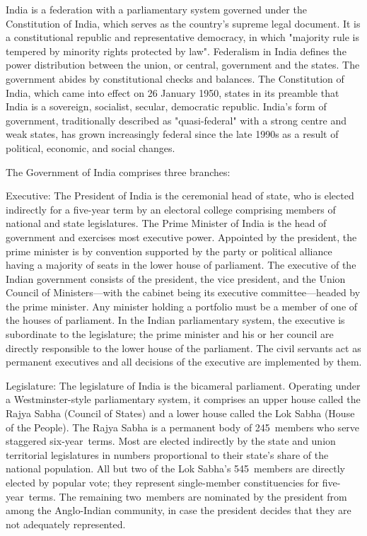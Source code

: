 India is a federation with a parliamentary system governed under the
Constitution of India, which serves as the country's supreme legal
document. It is a constitutional republic and representative democracy,
in which "majority rule is tempered by minority rights protected by
law". Federalism in India defines the power distribution between the
union, or central, government and the states. The government abides by
constitutional checks and balances. The Constitution of India, which
came into effect on 26 January 1950, states in its preamble that India
is a sovereign, socialist, secular, democratic republic. India's form of
government, traditionally described as "quasi-federal" with a strong
centre and weak states, has grown increasingly federal since the late
1990s as a result of political, economic, and social changes.

The Government of India comprises three branches:

Executive: The President of India is the ceremonial head of state, who
is elected indirectly for a five-year term by an electoral college
comprising members of national and state legislatures. The Prime
Minister of India is the head of government and exercises most executive
power. Appointed by the president, the prime minister is by convention
supported by the party or political alliance having a majority of seats
in the lower house of parliament. The executive of the Indian government
consists of the president, the vice president, and the Union Council of
Ministers---with the cabinet being its executive committee---headed by
the prime minister. Any minister holding a portfolio must be a member of
one of the houses of parliament. In the Indian parliamentary system, the
executive is subordinate to the legislature; the prime minister and his
or her council are directly responsible to the lower house of the
parliament. The civil servants act as permanent executives and all
decisions of the executive are implemented by them.

Legislature: The legislature of India is the bicameral parliament.
Operating under a Westminster-style parliamentary system, it comprises
an upper house called the Rajya Sabha (Council of States) and a lower
house called the Lok Sabha (House of the People). The Rajya Sabha is a
permanent body of 245~members who serve staggered six-year~terms. Most
are elected indirectly by the state and union territorial legislatures
in numbers proportional to their state's share of the national
population. All but two of the Lok Sabha's 545~members are directly
elected by popular vote; they represent single-member constituencies for
five-year~terms. The remaining two~members are nominated by the
president from among the Anglo-Indian community, in case the president
decides that they are not adequately represented.

